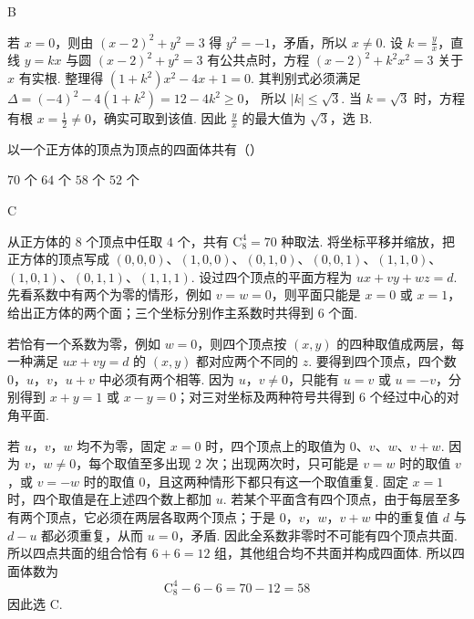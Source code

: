 \begin{answer}
B
\end{answer}

\begin{solution}
若 \(x=0\)，则由 \((x-2)^2+y^2=3\) 得 \(y^2=-1\)，矛盾，所以 \(x\ne0\). 设 \(k=\frac{y}{x}\)，直线 \(y=kx\) 与圆 \((x-2)^2+y^2=3\) 有公共点时，方程
\((x-2)^2+k^2x^2=3\)
关于 \(x\) 有实根. 整理得
\((1+k^2)x^2-4x+1=0\).
其判别式必须满足
\(\Delta=(-4)^2-4(1+k^2)=12-4k^2\geqslant0\)，
所以 \(|k|\leqslant\sqrt{3}\). 当 \(k=\sqrt{3}\) 时，方程有根 \(x=\frac12\ne0\)，确实可取到该值. 因此 \(\frac{y}{x}\) 的最大值为 \(\sqrt{3}\)，选 B.
\end{solution}

\begin{problem}
以一个正方体的顶点为顶点的四面体共有（\quad）

\choices
    {\(70\) 个}
    {\(64\) 个}
    {\(58\) 个}
    {\(52\) 个}
\end{problem}

\begin{answer}
C
\end{answer}

\begin{solution}
从正方体的 \(8\) 个顶点中任取 \(4\) 个，共有
\(\mathrm C_8^4=70\)
种取法. 将坐标平移并缩放，把正方体的顶点写成 \((0,0,0)\)、\((1,0,0)\)、\((0,1,0)\)、\((0,0,1)\)、\((1,1,0)\)、\((1,0,1)\)、\((0,1,1)\)、\((1,1,1)\). 设过四个顶点的平面方程为 \(ux+vy+wz=d\). 先看系数中有两个为零的情形，例如 \(v=w=0\)，则平面只能是 \(x=0\) 或 \(x=1\)，给出正方体的两个面；三个坐标分别作主系数时共得到 \(6\) 个面.

若恰有一个系数为零，例如 \(w=0\)，则四个顶点按 \((x,y)\) 的四种取值成两层，每一种满足 \(ux+vy=d\) 的 \((x,y)\) 都对应两个不同的 \(z\). 要得到四个顶点，四个数 \(0\)，\(u\)，\(v\)，\(u+v\) 中必须有两个相等. 因为 \(u\)，\(v\ne0\)，只能有 \(u=v\) 或 \(u=-v\)，分别得到 \(x+y=1\) 或 \(x-y=0\)；对三对坐标及两种符号共得到 \(6\) 个经过中心的对角平面.

若 \(u\)，\(v\)，\(w\) 均不为零，固定 \(x=0\) 时，四个顶点上的取值为
\(0\)、\(v\)、\(w\)、\(v+w\).
因为 \(v\)，\(w\ne0\)，每个取值至多出现 \(2\) 次；出现两次时，只可能是 \(v=w\) 时的取值 \(v\)，或 \(v=-w\) 时的取值 \(0\)，且这两种情形下都只有这一个取值重复. 固定 \(x=1\) 时，四个取值是在上述四个数上都加 \(u\). 若某个平面含有四个顶点，由于每层至多有两个顶点，它必须在两层各取两个顶点；于是 \(0\)，\(v\)，\(w\)，\(v+w\) 中的重复值 \(d\) 与 \(d-u\) 都必须重复，从而 \(u=0\)，矛盾. 因此全系数非零时不可能有四个顶点共面. 所以四点共面的组合恰有 \(6+6=12\) 组，其他组合均不共面并构成四面体. 所以四面体数为
\[
\mathrm C_8^4-6-6=70-12=58
\]
因此选 C.
\end{solution}

